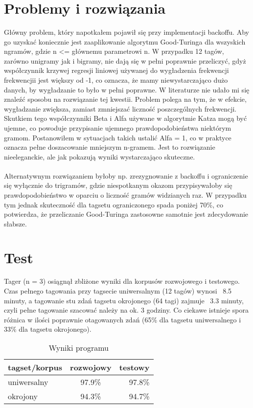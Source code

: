 \documentclass[11pt, a4paper]{article}
\begin{document}
\section{Problemy i rozwiązania}
\paragraph{}
Główny problem, który napotkałem pojawił się przy implementacji backoffu. Aby go uzyskać koniecznie jest zaaplikowanie algorytmu Good-Turinga dla wszyskich ngramów, gdzie n <= głównemu parametrowi n. W przypadku 12 tagów, zarówno unigramy jak i bigramy, nie dają się w pełni poprawnie przeliczyć, gdyż współczynnik krzywej regresji liniowej używanej do wygładzenia frekwencji frekwencjii jest większy od -1, co oznacza, że mamy niewystarczająco dużo danych, by wygładzanie to było w pełni poprawne. W literaturze nie udało mi się znaleźć sposobu na rozwiązanie tej kwestii. Problem polega na tym, że w efekcie, wygładzanie zwiększa, zamiast zmniejszać liczność poszczególnych frekwencji. Skutkiem tego współczynniki Beta i Alfa używane w algorytmie Katza mogą być ujemne, co powoduje przypisanie  ujemnego prawdopodobieństwa niektórym gramom. Postanowiłem w sytuacjach takich ustalić Alfa = 1, co w praktyce oznacza pełne doszacowanie mniejszym n-gramem. Jest to rozwiązanie nieeleganckie, ale jak pokazują wyniki wystarczająco skuteczne.
\paragraph{}
Alternatywnym rozwiązaniem byłoby np. zrezygnowanie z backoffu i ograniczenie się wyłącznie do trigramów, gdzie niespotkanym okazom przypisywałoby się prawdopodobieństwo w oparciu o liczność gramów widzianych raz. W przypadku tym jednak skuteczność dla tagsetu ograniczonego spada poniżej 70\%, co potwierdza, że przeliczanie Good-Turinga zastosowne samotnie jest zdecydowanie słabsze. 
\section{Test}
\paragraph{}
Tager (n = 3) osiągnął zbliżone wyniki dla korpusów rozwojowego i testowego. Czas pełnego tagowania przy tagsecie uniwersalnym (12 tagów) wynosi ~8.5 minuty, a tagowanie stu zdań tagsetu okrojonego (64 tagi) zajmuje ~3.3 minuty, czyli pełne tagowanie szacować należy na ok. 3 godziny.
Co ciekawe istnieje spora różnica w ilości poprawnie otagowanych zdań (65\% dla tagsetu uniwersalnego i 33\% dla tagsetu okrojonego).
\begin{table}[h!]
  \centering
  \caption{Wyniki programu}
  \label{tab:table1}
  \begin{tabular}{l|c|r}
    tagset/korpus & rozwojowy & testowy\\
    \hline
    uniwersalny & 97.9\% & 97.8\%\\
    \hline
    okrojony & 94.3\% & 94.7\%\\
  \end{tabular}
\end{table}
\end{document}
